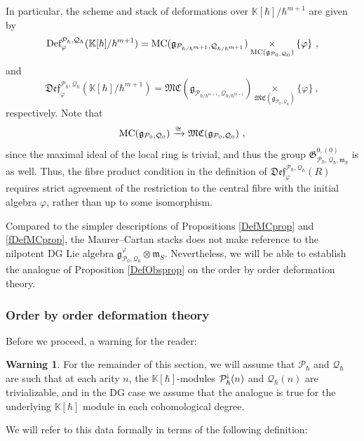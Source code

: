 \documentclass[11pt]{amsart}
\numberwithin{equation}{section}
\theoremstyle{definition}
\newtheorem{warn}[theo]{Warning}
\newcommand{\bb}{\mathbb}
\newcommand{\mc}{\mathcal}
\newcommand{\mf}{\mathfrak}
\newcommand{\Def}{{\textup{Def}}}
\newcommand{\fDef}{{\mathfrak{Def}}}
\newcommand{\Ph}{{\mathcal{P}_\hbar}}
\newcommand{\Qh}{{\mathcal{Q}_\hbar}}
\newcommand{\Kh}{{\K[\hbar]}}
\newcommand{\K}{{\bb K}}
\newcommand{\ash}{{\textup{\mbox{!`}}}}
\newcommand{\MC}{{{\textup{MC}}}}
\newcommand{\fMC}{{{\mathfrak{MC}}}}
\newcommand{\0}{{\textbf{0}}}
\newcommand{\gr}{\textup{gr}}
\newcommand{\g}{{\mf{g}}}
\def\PP{{\mc P}}
\def\QQ{{\mc Q}}
\def\gf{\mathfrak{g}}
\def \mf{\mathfrak}
\newcommand{\fibre}[1]{\underset{#1}{\times}}
\begin{document}
In particular, the scheme and stack of deformations over $\K[\hbar]/\hbar^{m+1}$ are given by
\[
	 \Def_\varphi^{\Ph,\Qh}(\K[\hbar]/\hbar^{m+1})  =\MC(\g_{\PP_{\hbar/\hbar^{m+1}},\QQ_{\hbar/\hbar^{m+1}}})\fibre{\MC(\g_{\mc P_0,\mc Q_0})} \{ \varphi \} ~,
\]
and
\[
	 \fDef_\varphi^{\Ph,\Qh}(\K[\hbar]/\hbar^{m+1})  =\fMC(\g_{\PP_{\hbar/\hbar^{m+1}},\QQ_{\hbar/\hbar^{m+1}}})\fibre{\fMC(\g_{\mc P_0,\mc Q_0})} \{ \varphi \} ~,
\]
respectively. Note that
\[ 
\MC(\g_{\mc P_0,\mc Q_0})\xrightarrow{\cong }\fMC(\g_{\mc P_0,\mc Q_0}) \ , 
\]
since the maximal ideal of the local ring is trivial, and thus the group $\mf G^{0,(0)}_{\Ph,\Qh,\mf m_S}$ is as well. Thus, the fibre product condition in the definition of  $\fDef_\varphi^{\Ph,\Qh}(R) $ requires strict agreement of the restriction to the central fibre with the initial algebra $\varphi$, rather than up to some isomorphism.

Compared to the simpler descriptions of Propositions \ref{DefMCprop} and \ref{fDefMCprop}, the Maurer--Cartan stacks does not make reference to the nilpotent DG Lie algebra $\gf_{\PP_0,\QQ_0}^{\varphi}\otimes \mf m_S$. Nevertheless, we will be able to establish the analogue of Proposition \ref{DefObsprop} on the order by order deformation theory.

\subsubsection{Order by order deformation theory}

Before we proceed, a warning for the reader:

\begin{warn}\label{flatwarn}
	For the remainder of this section, we will assume that $\mc P_\hbar$ and $\mc Q_\hbar$ are such that at each arity $n$, the  $\K[\hbar]$-modules $\mc P_\hbar^\ash(n)$ and $\mc Q_\hbar(n)$ are trivializable, and in the DG case we assume that the analogue is true for the underlying  $\Kh$ module in each cohomological degree. 

\end{warn}

We will refer to this data formally in terms of the following definition:
\end{document}
